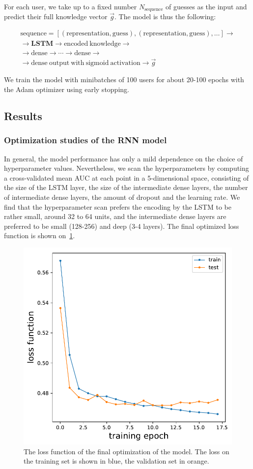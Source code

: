 For each user, we take up to a fixed number $N_{\mathrm{sequence}}$ of guesses as the input and predict their full knowledge vector $\vec{g}$. The model is thus the following:

\begin{gather*}
\mathrm{sequence} = [(\mathrm{representation}, \mathrm{guess}), (\mathrm{representation}, \mathrm{guess}), \dots] \rightarrow \\
\rightarrow \mathbf{LSTM} \rightarrow \mathrm{encoded\ knowledge} \rightarrow \\ \rightarrow \mathrm{dense} \rightarrow \cdots \rightarrow \mathrm{dense} \rightarrow \\
\rightarrow \mathrm{dense\ output\ with\ sigmoid\ activation} \rightarrow \vec{g} 
\end{gather*}

We train the model with minibatches of 100 users for about 20-100 epochs with the Adam optimizer using early stopping.

\subsection{Results}

\subsubsection{Optimization studies of the RNN model}

In general, the model performance has only a mild dependence on the choice of hyperparameter values. Nevertheless, we scan the hyperparameters by computing a cross-validated mean AUC at each point in a 5-dimensional space, consisting of the size of the LSTM layer, the size of the intermediate dense layers, the number of intermediate dense layers, the amount of dropout and the learning rate. We find that the hyperparameter scan prefers the encoding by the LSTM to be rather small, around 32 to 64 units, and the intermediate dense layers are preferred to be small (128-256) and deep (3-4 layers). The final optimized loss function is shown on~\cref{fig:loss}.

\begin{figure}[ht]
\centering
\includegraphics[width=0.5\linewidth]{figures/lingvist/loss.pdf}
\caption{The loss function of the final optimization of the model. The loss on the training set is shown in blue, the validation set in orange.} 
\label{fig:loss} 
\end{figure} 

